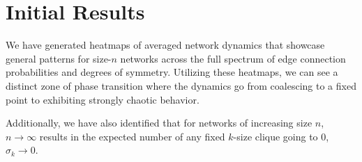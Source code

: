 
\section{Initial Results}
\label{sec:Initial Results}

We have generated heatmaps of averaged network dynamics that showcase general patterns for size-$n$ networks across the full spectrum of edge connection probabilities and degrees of symmetry. Utilizing these heatmaps, we can see a distinct zone of phase transition where the dynamics go from coalescing to a fixed point to exhibiting strongly chaotic behavior.

Additionally, we have also identified that for networks of increasing size $n$, $n\to\infty$ results in the expected number of any fixed $k$-size clique going to 0, $\sigma_k \to 0$.
